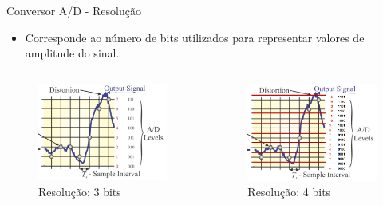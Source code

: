 \documentclass[aspectratio=169,
				xcolor=table]{beamer}
\begin{document}
	\begin{frame}{Conversor A/D - Resolução}
		\begin{itemize}
			\item Corresponde ao número de bits utilizados para representar valores de amplitude do sinal.
		\end{itemize}
		\vspace{-1.5em}
		\begin{columns}
			\begin{column}{0.5\textwidth}
				\begin{figure}[hbtp]
					\centering
					\includegraphics[height=.6\textheight, keepaspectratio]{../figs/cap01/res3bits.png}
					\caption{Resolução: 3 bits}
				\end{figure}
			\end{column}
			\begin{column}{0.5\textwidth}
				\begin{figure}[hbtp]
					\centering
					\includegraphics[height=.6\textheight, keepaspectratio]{../figs/cap01/res4bits.png}
					\caption{Resolução: 4 bits}
				\end{figure}
			\end{column}
		\end{columns}
	\end{frame}
\end{document}
